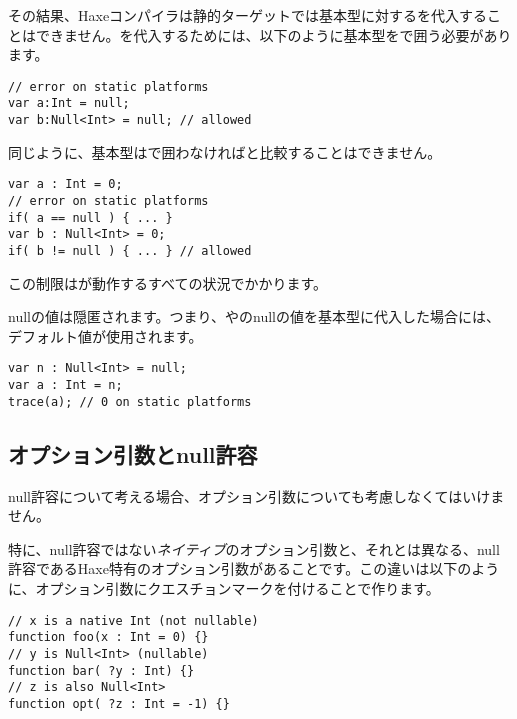 その結果、Haxeコンパイラは静的ターゲットでは基本型に対するを代入することはできません。を代入するためには、以下のように基本型をで囲う必要があります。

\begin{lstlisting}
// error on static platforms
var a:Int = null;
var b:Null<Int> = null; // allowed
\end{lstlisting}

同じように、基本型はで囲わなければと比較することはできません。

\begin{lstlisting}
var a : Int = 0;
// error on static platforms
if( a == null ) { ... }
var b : Null<Int> = 0;
if( b != null ) { ... } // allowed
\end{lstlisting}

この制限はが動作するすべての状況でかかります。


nullの値は隠匿されます。つまり、やのnullの値を基本型に代入した場合には、デフォルト値が使用されます。

\begin{lstlisting}
var n : Null<Int> = null;
var a : Int = n;
trace(a); // 0 on static platforms
\end{lstlisting}



\subsection{オプション引数とnull許容}
\label{types-nullability-optional-arguments}

null許容について考える場合、オプション引数についても考慮しなくてはいけません。

特に、null許容ではない\emph{ネイティブ}のオプション引数と、それとは異なる、null許容であるHaxe特有のオプション引数があることです。この違いは以下のように、オプション引数にクエスチョンマークを付けることで作ります。

\begin{lstlisting}
// x is a native Int (not nullable)
function foo(x : Int = 0) {}
// y is Null<Int> (nullable)
function bar( ?y : Int) {}
// z is also Null<Int>
function opt( ?z : Int = -1) {}
\end{lstlisting}

